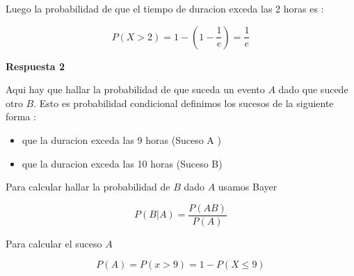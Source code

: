 \documentclass{article}
\begin{document}
\begin{flushleft}
        Luego la probabilidad de que el tiempo de duracion exceda las 2 horas es : 

        \begin{equation*}
            P \left(X > 2 \right) = 1 - \left(1 - \frac{1}{e}\right)  = \frac{1}{e} 
        \end{equation*}


        {\bf Respuesta 2 } 

        Aqui hay que hallar la probabilidad de que suceda un evento $A$ dado que sucede otro $B$.
        Esto es probabilidad condicional definimos los sucesos de la siguiente forma :

        \begin{itemize}
            \item que la duracion exceda las 9 horas (Suceso A )
            \item que la duracion exceda las 10 horas (Suceso B)
        \end{itemize}
        
        Para calcular hallar la probabilidad de $B$ dado $A$ usamos Bayer
        
        \begin{equation*}
            P \left(B | A  \right) = \frac{P \left(AB\right)}{P\left(A\right)}
        \end{equation*}

        Para calcular el suceso $A$ 

        \begin{equation*}
            P\left(A \right) = P \left(x > 9 \right) = 1 - P \left(X \le 9 \right)
        \end{equation*}


\end{flushleft}
\end{document}
